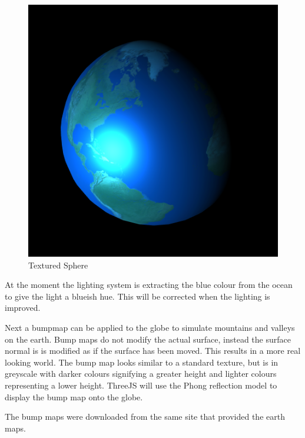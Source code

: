 \documentclass[]{article}
\begin{document}
\begin{figure}[H]
   \centering
   \includegraphics[width=0.5\linewidth]{images/textured_sphere}
   \caption{Textured Sphere}
   \label{fig:textured_sphere}
\end{figure}

At the moment the lighting system is extracting the blue colour from the ocean to give the light a blueish hue.
This will be corrected when the lighting is improved.

Next a bumpmap can be applied to the globe to simulate mountains and valleys on the earth.
Bump maps do not modify the actual surface, instead the surface normal is is modified as if the surface has been moved.
This results in a more real looking world.
The bump map looks similar to a standard texture, but is in greyscale with darker colours signifying a greater height and lighter colours representing a lower height.
ThreeJS will use the Phong reflection model\cite{} to display the bump map onto the globe.


The bump maps were downloaded from the same site that provided the earth maps.
\end{document}

